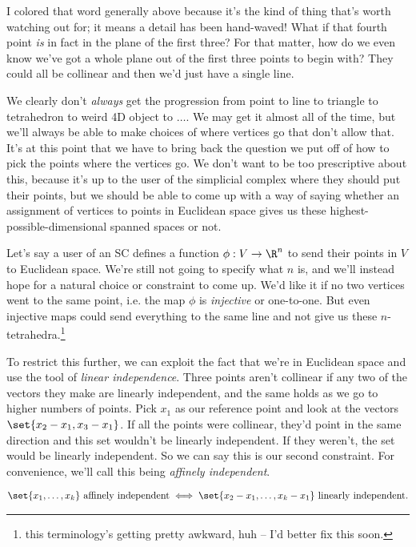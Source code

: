 \documentclass{lec}
\begin{document}
    I colored that word {\color{red} generally} above because it's the kind of thing that's worth watching out for; it means a detail has been hand-waved! What if that fourth point \textit{is} in fact in the plane of the first three? For that matter, how do we even know we've got a whole plane out of the first three points to begin with? They could all be collinear and then we'd just have a single line.

    We clearly don't \textit{always} get the progression from point to line to triangle to tetrahedron to weird 4D object to $\dots$. We may get it almost all of the time, but we'll always be able to make choices of where vertices go that don't allow that. It's at this point that we have to bring back the question we put off of how to pick the points where the vertices go. We don't want to be too prescriptive about this, because it's up to the user of the simplicial complex where they should put their points, but we should be able to come up with a way of saying whether an assignment of vertices to points in Euclidean space gives us these highest-possible-dimensional spanned spaces or not. 

    Let's say a user of an SC defines a function $\phi: V \to \R^n$ to send their points in $V$ to Euclidean space. We're still not going to specify what $n$ is, and we'll instead hope for a natural choice or constraint to come up. We'd like it if no two vertices went to the same point, i.e. the map $\phi$ is \textit{injective} or one-to-one. But even injective maps could send everything to the same line and not give us these $n$-tetrahedra.\footnote{this terminology's getting pretty awkward, huh -- I'd better fix this soon.} 
    
    To restrict this further, we can exploit the fact that we're in Euclidean space and use the tool of \textit{linear independence}. Three points aren't collinear if any two of the vectors they make are linearly independent, and the same holds as we go to higher numbers of points. Pick $x_1$ as our reference point and look at the vectors $\set{x_2 - x_1, x_3 - x_1}$. If all the points were collinear, they'd point in the same direction and this set wouldn't be linearly independent. If they weren't, the set would be linearly independent. So we can say this is our second constraint. For convenience, we'll call this being \textit{affinely independent}.

    \begin{align*}
        \set{x_1, \dots, x_k} \text{ affinely independent} \iff \set{x_2 - x_1, \dots, x_k - x_1} \text{ linearly independent}.
    \end{align*}
\end{document}
